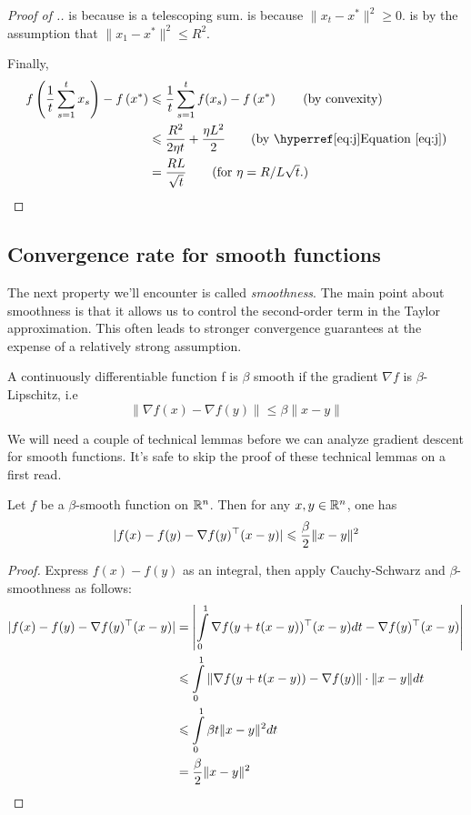 \begin{proof}[Proof of .]
 is because  is a telescoping sum.
 is because $\lVert x_{t} - x^* \rVert^2 \geq 0$.
 is by the assumption that $\lVert x_1 - x^* \rVert^2 \leq R^2$.

Finally,
\begin{align*}
    f\left(\frac{1}{t}\sum_{s=1}^t x_s\right) - f\left(x^*\right)
&\leq \frac{1}{t} \sum_{s=1}^t f(x_s) - f\left(x^*\right) \tag{by convexity} \\
&\leq \frac{R^2}{2\eta t} + \frac{\eta L^2}{2} \tag{by \equationref{j}}\\
&=\frac{RL}{\sqrt{t}} \tag{for $\eta=R/L\sqrt{t}.$}
\end{align*}

\end{proof}

\subsection{Convergence rate for smooth functions}

The next property we'll encounter is called \emph{smoothness}.  The main point
about smoothness is that it allows us to control the second-order term in the
Taylor approximation. This often leads to stronger convergence guarantees at the
expense of a relatively strong assumption.

\begin{definition}[Smoothness]
A continuously differentiable function f is $\beta$ smooth if the gradient $\nabla f$ is $\beta$-Lipschitz, i.e
$$\|\nabla f(x) - \nabla f(y)\| \leq \beta\|x-y\|$$
\end{definition}

We will need a couple of technical lemmas before we can analyze gradient descent
for smooth functions. It's safe to skip the proof of these technical lemmas on a
first read.

\begin{lemma}\label{l1}
Let $f$ be a $\beta$-smooth function on $\mathbb{R}^n$.  Then for any $x,y \in \mathbb{R}^n$, one has
$$|f(x) - f(y) - \nabla f(y)^\top(x-y)| \leqslant \frac{\beta}{2}\|x-y\|^2$$
\end{lemma}

\begin{proof}
Express $f(x) - f(y)$ as an integral, then apply Cauchy-Schwarz and 
$\beta$-smoothness as follows:
\begin{align*}
|f(x) - f(y) - \nabla f(y)^\top(x-y)|
&=\left|\int\limits_{0}^1 \nabla f(y + t(x-y))^\top(x-y)dt - \nabla
f(y)^\top(x-y)\right|\\
&\leqslant  \int\limits_{0}^1 \|\nabla f(y + t(x-y)) - \nabla f(y)\|\cdot \|x-y\|dt\\
&\leqslant \int\limits_{0}^1 \beta t\|x-y\|^2dt\\
&= \frac{\beta}{2}\|x-y\|^2\qedhere
\end{align*}
\end{proof}

